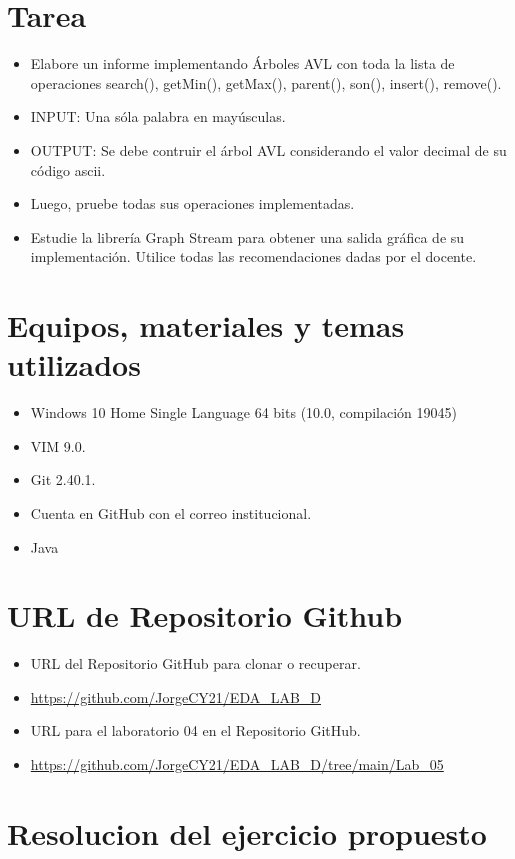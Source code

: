 \documentclass{article}
\begin{document}
	
	\section{Tarea}
	\begin{itemize}
		\item Elabore un informe implementando Árboles AVL con toda la lista de operaciones search(), getMin(), getMax(), parent(), son(), insert(), remove(). 
		\item INPUT: Una sóla palabra en mayúsculas. 
		\item OUTPUT: Se debe contruir el árbol AVL considerando el valor decimal de su código ascii. 
		\item Luego, pruebe todas sus operaciones implementadas. 
		\item Estudie la librería Graph Stream para obtener una salida gráfica de su implementación. Utilice todas las recomendaciones dadas por el docente.
	\end{itemize}
	
	
	\section{Equipos, materiales y temas utilizados}
	\begin{itemize}
		\item Windows 10 Home Single Language 64 bits (10.0, compilación 19045)
		\item VIM 9.0.
		\item Git 2.40.1.
		\item Cuenta en GitHub con el correo institucional.
		\item Java
	\end{itemize}
	
	\section{URL de Repositorio Github}
	\begin{itemize}
		\item URL del Repositorio GitHub para clonar o recuperar.
		\item \url{https://github.com/JorgeCY21/EDA_LAB_D}
		\item URL para el laboratorio 04 en el Repositorio GitHub.
		\item \url{https://github.com/JorgeCY21/EDA_LAB_D/tree/main/Lab_05}
	\end{itemize}
	
	
	\section{Resolucion del ejercicio propuesto}	
	
\end{document}
